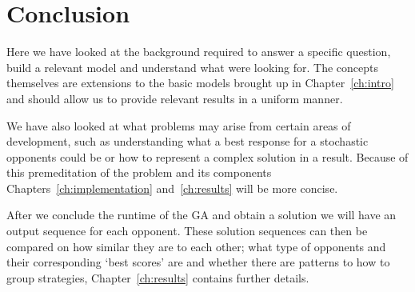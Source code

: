 \section{Conclusion}
Here we have looked at the background required to answer a specific question, build a relevant model and understand what were looking for.
The concepts themselves are extensions to the basic models brought up in Chapter~\ref{ch:intro} and should allow us to provide relevant results in a uniform manner.

We have also looked at what problems may arise from certain areas of development, such as understanding what a best response for a stochastic opponents could be or how to represent a complex solution in a result.
Because of this premeditation of the problem and its components Chapters~\ref{ch:implementation} and~\ref{ch:results} will be more concise.

After we conclude the runtime of the GA and obtain a solution we will have an output sequence for each opponent.
These solution sequences can then be compared on how similar they are to each other;
what type of opponents and their corresponding `best scores' are and whether there are patterns to how to group strategies, Chapter~\ref{ch:results} contains further details.